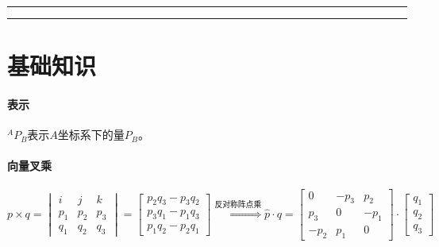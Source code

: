 \documentclass[
12pt, %
a4paper, 
oneside, %
headinclude,footinclude, %
]{scrartcl}
\title{\normalfont\spacedallcaps{机器人学导论}}
\date{}
\begin{document}
\maketitle
\newpage
\hypertarget{toc}{}
\begingroup
\begin{multicols}{2}
\tableofcontents
\end{multicols}
\endgroup
\hrule
\begingroup
\begin{multicols}{2}
\listoffigures
\end{multicols}
\endgroup
\hrule
\begingroup
\begin{multicols}{2}
\listoftables
\end{multicols}
\endgroup
\newpage
\begingroup
\begin{multicols}{2}
\listoftips
\end{multicols}
\endgroup
\newpage
\section{基础知识}
\paragraph{表示}
$ {}^A P_B $表示$ A $坐标系下的量$ P_B $。
\paragraph{向量叉乘}
$$
p \times q = \begin{vmatrix} i & j & k \\ p_1 & p_2 & p_3 \\ q_1 & q_2 & q_3 \end{vmatrix} = \begin{bmatrix} p_2 q_3 - p_3 q_2 \\ p_3 q_1 - p_1 q_3 \\ p_1 q_2 - p_2 q_1 \end{bmatrix}
\overset{\text{反对称阵点乘}}{\Longrightarrow}
\hat{p} \cdot q = \begin{bmatrix} 0 & -p_3 & p_2 \\ p_3 & 0 & -p_1 \\ -p_2 & p_1 & 0 \end{bmatrix} \cdot \begin{bmatrix} q_1 \\ q_2 \\ q_3 \end{bmatrix}
$$
\end{document}
